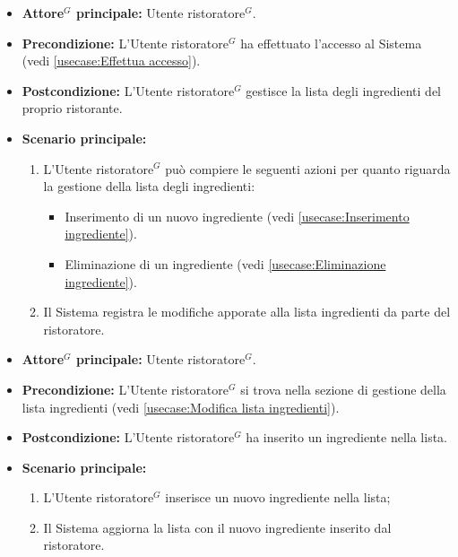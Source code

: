 \label{usecase:Modifica lista ingredienti}
\begin{itemize}
	\item \textbf{\gls{Attore}$^G$ principale:} \gls{Utente ristoratore}$^G$.

	\item \textbf{Precondizione:} L'\gls{Utente ristoratore}$^G$ ha effettuato l'accesso al Sistema (vedi \autoref{usecase:Effettua accesso}).

	\item \textbf{Postcondizione:} L'\gls{Utente ristoratore}$^G$ gestisce la lista degli ingredienti del proprio ristorante.


	\item \textbf{Scenario principale:}
	      \begin{enumerate}

		      \item L'\gls{Utente ristoratore}$^G$ può compiere le seguenti azioni per quanto riguarda la gestione della lista degli ingredienti:
		      \begin{itemize}
                \item Inserimento di un nuovo ingrediente (vedi \autoref{usecase:Inserimento ingrediente}).
                \item Eliminazione di un ingrediente (vedi \autoref{usecase:Eliminazione ingrediente}).
              \end{itemize}
		      \item Il Sistema registra le modifiche apporate alla lista ingredienti da parte del ristoratore.

	      \end{enumerate}
\end{itemize}

\label{usecase:Inserimento ingrediente}
\begin{itemize}

	\item \textbf{\gls{Attore}$^G$ principale:} \gls{Utente ristoratore}$^G$.

	\item \textbf{Precondizione:} L'\gls{Utente ristoratore}$^G$ si trova nella sezione di gestione della lista ingredienti (vedi \autoref{usecase:Modifica lista ingredienti}).

	\item \textbf{Postcondizione:} L'\gls{Utente ristoratore}$^G$ ha inserito un ingrediente nella lista.

	\item \textbf{Scenario principale:}
	\begin{enumerate}
		\item L'\gls{Utente ristoratore}$^G$ inserisce un nuovo ingrediente nella lista;
		\item Il Sistema aggiorna la lista con il nuovo ingrediente inserito dal ristoratore.
	\end{enumerate}

\end{itemize}


